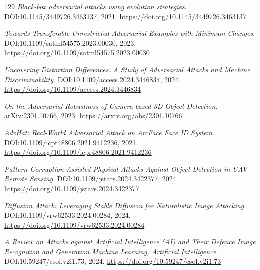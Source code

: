 \documentclass[11pt,a4paper]{article}
\begin{document}
\begin{thebibliography}{129}
\newblock \emph{Black-box adversarial attacks using evolution strategies}.
\newblock DOI:10.1145/3449726.3463137, 2021.
\newblock \url{https://doi.org/10.1145/3449726.3463137}

\newblock \emph{Towards Transferable Unrestricted Adversarial Examples with Minimum Changes}.
\newblock DOI:10.1109/satml54575.2023.00030, 2023.
\newblock \url{https://doi.org/10.1109/satml54575.2023.00030}

\newblock \emph{Uncovering Distortion Differences: A Study of Adversarial Attacks and Machine Discriminability}.
\newblock DOI:10.1109/access.2024.3446834, 2024.
\newblock \url{https://doi.org/10.1109/access.2024.3446834}

\newblock \emph{On the Adversarial Robustness of Camera-based 3D Object Detection}.
\newblock arXiv:2301.10766, 2023.
\newblock \url{https://arxiv.org/abs/2301.10766}

\newblock \emph{AdvHat: Real-World Adversarial Attack on ArcFace Face ID System}.
\newblock DOI:10.1109/icpr48806.2021.9412236, 2021.
\newblock \url{https://doi.org/10.1109/icpr48806.2021.9412236}

\newblock \emph{Pattern Corruption-Assisted Physical Attacks Against Object Detection in UAV Remote Sensing}.
\newblock DOI:10.1109/jstars.2024.3422377, 2024.
\newblock \url{https://doi.org/10.1109/jstars.2024.3422377}

\newblock \emph{Diffusion Attack: Leveraging Stable Diffusion for Naturalistic Image Attacking}.
\newblock DOI:10.1109/vrw62533.2024.00284, 2024.
\newblock \url{https://doi.org/10.1109/vrw62533.2024.00284}

\newblock \emph{A Review on Attacks against Artificial Intelligence (AI) and Their Defence Image Recognition and Generation Machine Learning, Artificial Intelligence}.
\newblock DOI:10.59247/csol.v2i1.73, 2024.
\newblock \url{https://doi.org/10.59247/csol.v2i1.73}

\end{thebibliography}
\end{document}
